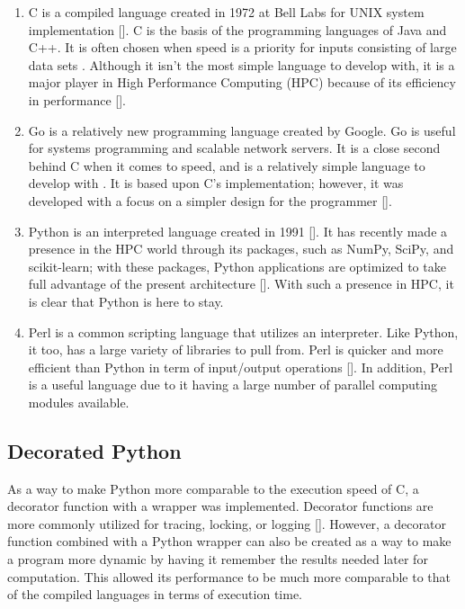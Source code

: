 \documentclass{sig-alternate}
\begin{document}
\begin{enumerate}
\item {\em}C is a compiled language created in 1972 at Bell Labs for UNIX system implementation [\cite{languages}]. C is the basis of the programming languages of Java and C++. It is often chosen when speed is a priority for inputs consisting of large data sets \cite{nicepaper1}. Although it isn't the most simple language to develop with, it is a major player in High Performance Computing (HPC) because of its efficiency in performance [\cite{HPC}].
\item {\em}Go is a relatively new programming language created by Google. Go is useful for systems programming and scalable network servers. It is a close second behind C when it comes to speed, and is a relatively simple language to develop with \cite{HPC}. It is based upon C's implementation; however, it was developed with a focus on a simpler design for the programmer [\cite{HPC}]. 
\item {\em}Python is an interpreted language created in 1991 [\cite{Python}]. It has recently made a presence in the HPC world through its packages, such as NumPy, SciPy, and scikit-learn; with these packages, Python applications are optimized to take full 
advantage of the present architecture [\cite{Python}]. With such a presence in HPC, it is clear that Python is here to stay.
\item  {\em}Perl is a common scripting language that utilizes an interpreter. Like Python, it too, has a large variety of libraries to pull from. Perl is quicker and more efficient than Python in term of input/output operations [\cite{Bioinformatics}]. In addition, Perl is a useful language due to it having a large number of parallel computing modules available.
\end{enumerate}


\subsection{Decorated Python}

As a way to make Python more comparable to the execution speed of C, a decorator function with a wrapper was implemented. Decorator functions are more commonly utilized for tracing, locking, or logging [\cite{nicepaper2}]. However, a decorator function combined with a Python wrapper can also be created as a way to make a program more dynamic by having it remember the results needed later for computation. This allowed its performance to be much more comparable to that of the compiled languages in terms of execution time.
\end{document}
